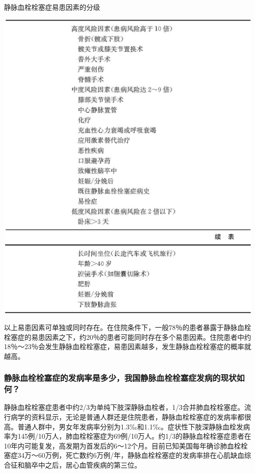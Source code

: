 \begin{table}[htbp]
\centering
\caption{静脉血栓栓塞症易患因素的分级}
\label{tab16-4}
\includegraphics[width=\textwidth,height=\textheight,keepaspectratio]{./images/Image00119.jpg}
\includegraphics[width=\textwidth,height=\textheight,keepaspectratio]{./images/Image00120.jpg}
\end{table}

以上易患因素可单独或同时存在。在住院条件下，一般78％的患者暴露于静脉血栓栓塞症的易患因素之下，约20％的患者可能同时存在多个易患因素。住院患者中约18％～23％会发生静脉血栓栓塞症，易患因素越多，发生静脉血栓栓塞症的概率就越高。

\subsubsection{静脉血栓栓塞症的发病率是多少，我国静脉血栓栓塞症发病的现状如何？}

静脉血栓栓塞症患者中约2/3为单纯下肢深静脉血栓者，1/3合并肺血栓栓塞症。流行病学的资料显示，无论是普通人群还是住院患者，静脉血栓栓塞症的发病率都很高。普通人群中，男女年发病率分别为1.3‰和1.1‰。症状性下肢深静脉血栓发病率为145例/10万人，肺血栓栓塞症为69例/10万人。约1/3的静脉血栓栓塞症患者在10年内可能复发，高发期为首发后的6～12个月。目前已知美国每年确诊肺血栓栓塞症34万～60万例，死亡数约6万例/年，静脉血栓栓塞症的发病率排在心肌缺血综合征和脑卒中之后，居心血管疾病的第三位。

